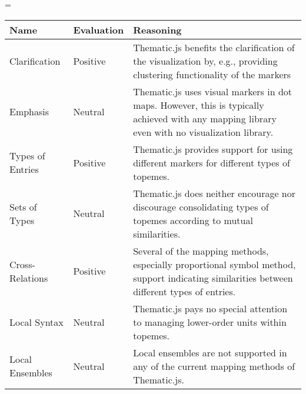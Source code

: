 \LTcapwidth=\textwidth
\begin{longtable}{|p{3cm}|p{2.5cm}|p{7.5cm}|}
\hline
\textbf{Name} & \textbf{Evaluation} & \textbf{Reasoning} \\ 
\hline
\endhead
\hline
\endfoot
\endlastfoot
Clarification & Positive & Thematic.js benefits the clarification of the visualization by, e.g., providing clustering functionality of the markers \\[0.5em]
Emphasis & Neutral & Thematic.js uses visual markers in dot maps. However, this is typically achieved with any mapping library even with no visualization library. \\[0.5em]
Types of Entries & Positive & Thematic.js provides support for using different markers for different types of topemes. \\[0.5em]
Sets of Types & Neutral & Thematic.js does neither encourage nor discourage consolidating types of topemes according to mutual similarities. \\[0.5em]
Cross-Relations & Positive & Several of the mapping methods, especially proportional symbol method, support indicating similarities between different types of entries. \\[0.5em]
Local Syntax & Neutral & Thematic.js pays no special attention to managing lower-order units within topemes. \\[0.5em]
Local Ensembles & Neutral & Local ensembles are not supported in any of the current mapping methods of Thematic.js. \\[0.5em]

\end{longtable}
